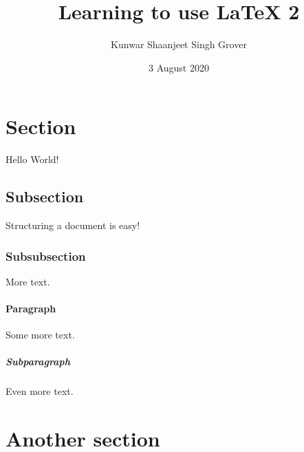 \documentclass{article}
\title{Learning to use LaTeX 2}
\author{Kunwar Shaanjeet Singh Grover}
\date{3 August 2020}
\begin{document}
    \maketitle
    \newpage

    \section{Section}

        Hello World!
    
    \subsection{Subsection}
        
        Structuring a document is easy!
    
    \subsubsection{Subsubsection}

        More text.
    
    \paragraph{Paragraph}

        Some more text.
    
    \subparagraph{Subparagraph}

        Even more text.
    
    \section{Another section}
\end{document}
